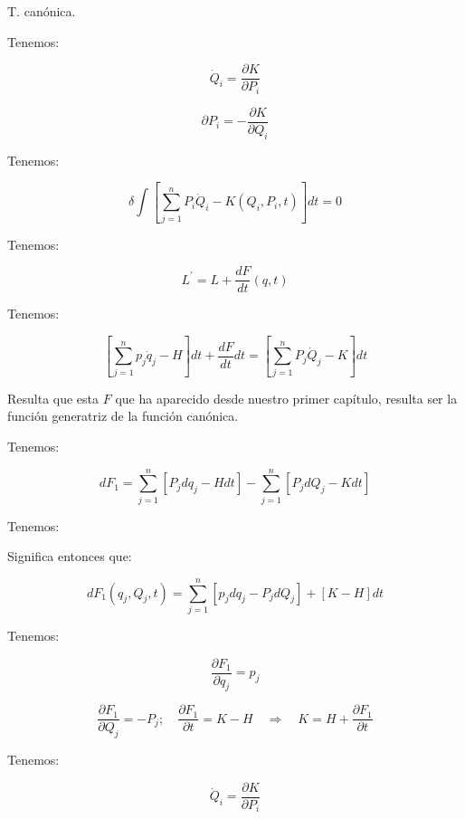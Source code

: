 \documentclass{article}
\begin{document}
T. canónica.


Tenemos:



\[ \dot{Q}_{i} = \frac{\partial K}{\partial P_{i}}   \]



\[ \partial{P}_{i}  = - \frac{ \partial K  }{\partial Q_{i}}  \]



Tenemos:




\[  \delta \int\limits \left[  \sum\limits_{j=1}^{n} P_{i}\dot{Q}_{i} - K(Q_{i},P_{i},t)   \right]  dt =0 \]



Tenemos:



\[ L^{\prime} = L + \frac{dF}{dt}(q,t) \]




Tenemos:





\[ \left[  \sum\limits_{j=1}^{n} p_{j}\dot{q}_{j} - H   \right] dt + \frac{dF}{dt} dt = \left[ \sum\limits_{j=1}^{n} P_{j}\dot{Q}_{j}-K \right]  dt \]




Resulta que esta $F$ que ha aparecido desde nuestro primer capítulo, resulta ser la función generatriz de la función canónica.



Tenemos:




\[ dF_{1} = \sum\limits_{j=1}^{n} \left[ P_{j} dq_{j}  - Hdt \right] - \sum\limits_{j=1}^{n} \left[ P_{j}dQ_{j}  - Kdt \right]  \]



Tenemos:


Significa entonces que:


\[ dF_{1}(q_{j},Q_{j},t) = \sum\limits_{j=1}^{n} \left[p_{j}dq_{j}-P_{j}dQ_{j}      \right] + \left[ K-H   \right]dt \]


Tenemos:

\[ \frac{ \partial F_{1} }{\partial q_{j}} = p_{j}  \]


\[  \frac{\partial F_{1}}{\partial Q_{j}} = - P_{j}; \quad \frac{\partial F_{1}}{\partial t} = K-H \quad \Rightarrow \quad \boxed{ K=H+ \frac{\partial F_{1}}{\partial t}  } \]


Tenemos:



\[ \dot{Q}_{i} = \frac{\partial K}{\partial P_{i}}  \]
\end{document}
